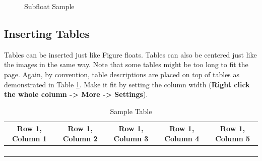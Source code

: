 \begin{figure}[H]
\begin{centering}
\par\end{centering}
\begin{centering}
\par\end{centering}
\caption{Subfloat Sample\label{fig:Subfloat-Sample}}
\end{figure}


\subsection{Inserting Tables}

Tables can be inserted just like Figure floats. Tables can also be
centered just like the images in the same way. Note that some tables
might be too long to fit the page. Again, by convention, table descriptions
are placed on top of tables as demonstrated in Table \ref{tab:Sample-Table}.
Make it fit by setting the column width (\textbf{Right click the whole
column -\textgreater{} More -\textgreater{} Settings}). 

\begin{table}[H]
\caption{Sample Table \label{tab:Sample-Table}}

\centering{}%
\begin{tabular}{|c|c|c|c|c|}
\hline 
Row 1, Column 1 & Row 1, Column 2 & Row 1, Column 3 & Row 1, Column 4 & Row 1, Column 5\tabularnewline
\hline 
\hline 
 &  &  &  & \tabularnewline
\hline 
 &  &  &  & \tabularnewline
\hline 
 &  &  &  & \tabularnewline
\hline 
 &  &  &  & \tabularnewline
\hline 
\end{tabular}
\end{table}


